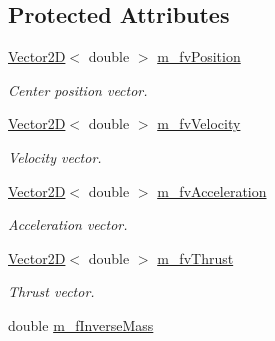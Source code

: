 \subsection*{Protected Attributes}
\begin{DoxyCompactItemize}
\item 
\hypertarget{class_collidable_ac72f55f30a447a47bf165ce8d7584027}{}\hyperlink{class_vector2_d}{Vector2\+D}$<$ double $>$ \hyperlink{class_collidable_ac72f55f30a447a47bf165ce8d7584027}{m\+\_\+fv\+Position}\label{class_collidable_ac72f55f30a447a47bf165ce8d7584027}

\begin{DoxyCompactList}\small\item\em Center position vector. \end{DoxyCompactList}\item 
\hypertarget{class_collidable_a3a46aab76b8a8651ca93f601f62c05fd}{}\hyperlink{class_vector2_d}{Vector2\+D}$<$ double $>$ \hyperlink{class_collidable_a3a46aab76b8a8651ca93f601f62c05fd}{m\+\_\+fv\+Velocity}\label{class_collidable_a3a46aab76b8a8651ca93f601f62c05fd}

\begin{DoxyCompactList}\small\item\em Velocity vector. \end{DoxyCompactList}\item 
\hypertarget{class_collidable_a43efbe42453578169f73f0b34cacc80c}{}\hyperlink{class_vector2_d}{Vector2\+D}$<$ double $>$ \hyperlink{class_collidable_a43efbe42453578169f73f0b34cacc80c}{m\+\_\+fv\+Acceleration}\label{class_collidable_a43efbe42453578169f73f0b34cacc80c}

\begin{DoxyCompactList}\small\item\em Acceleration vector. \end{DoxyCompactList}\item 
\hypertarget{class_collidable_ad88d617204dde9a1abc37e013e7c3d51}{}\hyperlink{class_vector2_d}{Vector2\+D}$<$ double $>$ \hyperlink{class_collidable_ad88d617204dde9a1abc37e013e7c3d51}{m\+\_\+fv\+Thrust}\label{class_collidable_ad88d617204dde9a1abc37e013e7c3d51}

\begin{DoxyCompactList}\small\item\em Thrust vector. \end{DoxyCompactList}\item 
\hypertarget{class_collidable_a7ea7747a2156545d13b4b7f6e06bfe38}{}double \hyperlink{class_collidable_a7ea7747a2156545d13b4b7f6e06bfe38}{m\+\_\+f\+Inverse\+Mass}\label{class_collidable_a7ea7747a2156545d13b4b7f6e06bfe38}


\end{DoxyCompactItemize}
